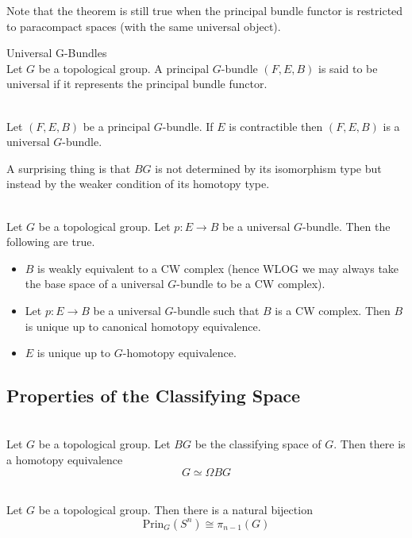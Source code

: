 \documentclass[a4paper]{article}
\begin{document}
Note that the theorem is still true when the principal bundle functor is restricted to paracompact spaces (with the same universal object). 

\begin{defn}{Universal G-Bundles}{}\\
Let $G$ be a topological group. A principal $G$-bundle $(F,E,B)$ is said to be universal if it represents the principal bundle functor. 
\end{defn}

\begin{thm}{}{}\\
Let $(F,E,B)$ be a principal $G$-bundle. If $E$ is contractible then $(F,E,B)$ is a universal $G$-bundle. 
\end{thm}

A surprising thing is that $BG$ is not determined by its isomorphism type but instead by the weaker condition of its homotopy type. 

\begin{prp}{}{}\\
Let $G$ be a topological group. Let $p:E\to B$ be a universal $G$-bundle. Then the following are true. 
\begin{itemize}
\item $B$ is weakly equivalent to a CW complex (hence WLOG we may always take the base space of a universal $G$-bundle to be a CW complex). 
\item Let $p:E\to B$ be a universal $G$-bundle such that $B$ is a CW complex. Then $B$ is unique up to canonical homotopy equivalence. 
\item $E$ is unique up to $G$-homotopy equivalence. 
\end{itemize}
\end{prp}

\subsection{Properties of the Classifying Space}
\begin{prp}{}{}\\
Let $G$ be a topological group. Let $BG$ be the classifying space of $G$. Then there is a homotopy equivalence $$G\simeq\Omega BG$$
\end{prp}

\begin{crl}{}{}\\
Let $G$ be a topological group. Then there is a natural bijection $$\text{Prin}_G(S^n)\cong\pi_{n-1}(G)$$
\end{crl}
\end{document}
